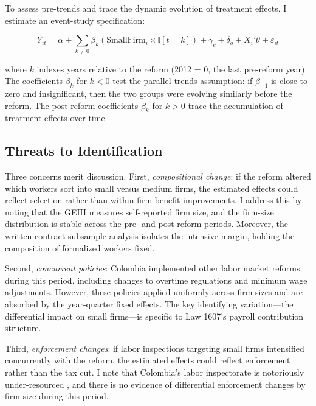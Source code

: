 \documentclass[12pt]{article}
\newcommand{\ind}{\mathbb{I}}
\begin{document}
To assess pre-trends and trace the dynamic evolution of treatment effects, I estimate an event-study specification:

\begin{equation}
\label{eq:event}
Y_{it} = \alpha + \sum_{k \neq 0} \beta_k \left(\text{SmallFirm}_i \times \ind[t = k]\right) + \gamma_c + \delta_q + X_i'\theta + \varepsilon_{it}
\end{equation}

\noindent where $k$ indexes years relative to the reform (2012 = 0, the last pre-reform year). The coefficients $\beta_k$ for $k < 0$ test the parallel trends assumption: if $\beta_{-1}$ is close to zero and insignificant, then the two groups were evolving similarly before the reform. The post-reform coefficients $\beta_k$ for $k > 0$ trace the accumulation of treatment effects over time.

\subsection{Threats to Identification}

Three concerns merit discussion. First, \textit{compositional change}: if the reform altered which workers sort into small versus medium firms, the estimated effects could reflect selection rather than within-firm benefit improvements. I address this by noting that the GEIH measures self-reported firm size, and the firm-size distribution is stable across the pre- and post-reform periods. Moreover, the written-contract subsample analysis isolates the intensive margin, holding the composition of formalized workers fixed.

Second, \textit{concurrent policies}: Colombia implemented other labor market reforms during this period, including changes to overtime regulations and minimum wage adjustments. However, these policies applied uniformly across firm sizes and are absorbed by the year-quarter fixed effects. The key identifying variation---the differential impact on small firms---is specific to Law 1607's payroll contribution structure.

Third, \textit{enforcement changes}: if labor inspections targeting small firms intensified concurrently with the reform, the estimated effects could reflect enforcement rather than the tax cut. I note that Colombia's labor inspectorate is notoriously under-resourced \citep{almeida2012enforcement}, and there is no evidence of differential enforcement changes by firm size during this period.
\end{document}
